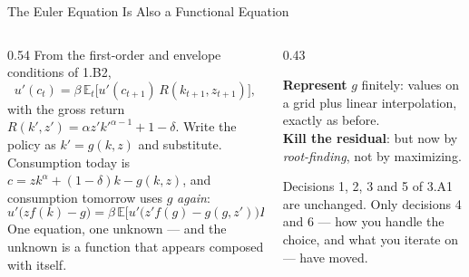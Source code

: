 \begin{frame}{The Euler Equation Is Also a Functional Equation}
\begin{columns}[T]
\begin{column}{0.54\textwidth}
\small
From the first-order and envelope conditions of 1.B2,
\[
  u'(c_t)=\beta\,\mathbb{E}_t\big[u'(c_{t+1})\,R(k_{t+1},z_{t+1})\big],
\]
with the gross return $R(k',z')=\alpha z' k'^{\alpha-1}+1-\delta$.
Write the policy as $k'=g(k,z)$ and substitute. Consumption today is $c=zk^{\alpha}+(1-\delta)k-g(k,z)$, and consumption tomorrow uses $g$ \emph{again}:
\[
  u'\big(zf(k)-g\big)=\beta\,\mathbb{E}\big[u'\big(z'f(g)-g(g,z')\big)R(g,z')\big].
\]
One equation, one unknown --- and the unknown is a function that appears composed with itself.
\end{column}
\begin{column}{0.43\textwidth}
\begin{conceptbox}[title=\textbf{The same two problems}]\small
\textbf{Represent} $g$ finitely: values on a grid plus linear interpolation, exactly as before.\\[1mm]
\textbf{Kill the residual}: but now by \emph{root-finding}, not by maximizing.
\end{conceptbox}
\medskip
\begin{takeawaybox}\footnotesize
Decisions 1, 2, 3 and 5 of 3.A1 are unchanged. Only decisions 4 and 6 --- how you handle the choice, and what you iterate on --- have moved.
\end{takeawaybox}
\end{column}
\end{columns}
\vspace{1mm}
\end{frame}

